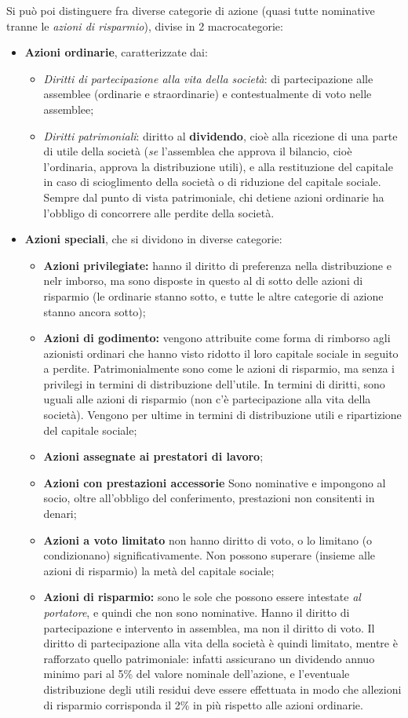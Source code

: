 \documentclass[a4paper,11pt]{article}
\begin{document}
Si può poi distinguere fra diverse categorie di azione (quasi tutte nominative tranne le \textit{azioni di risparmio}), divise in 2 macrocategorie:
\begin{itemize}
	\item \textbf{Azioni ordinarie}, caratterizzate dai:
	\begin{itemize}
		\item \textit{Diritti di partecipazione alla vita della società}: di partecipazione alle assemblee (ordinarie e straordinarie) e contestualmente di voto nelle assemblee;
		\item \textit{Diritti patrimoniali}: diritto al \textbf{dividendo}, cioè alla ricezione di una parte di utile della società (\textit{se} l'assemblea che approva il bilancio, cioè l'ordinaria, approva la distribuzione utili), e alla restituzione del capitale in caso di scioglimento della società o di riduzione del capitale sociale.
			Sempre dal punto di vista patrimoniale, chi detiene azioni ordinarie ha l'obbligo di concorrere alle perdite della società. 
	\end{itemize}
	\item \textbf{Azioni speciali}, che si dividono in diverse categorie:
		\begin{itemize}
			\item \textbf{Azioni privilegiate:} hanno il diritto di preferenza nella distribuzione e nelr imborso, ma sono disposte in questo al di sotto delle azioni di risparmio (le ordinarie stanno sotto, e tutte le altre categorie di azione stanno ancora sotto); 
			\item \textbf{Azioni di godimento:} vengono attribuite come forma di rimborso agli azionisti ordinari che hanno visto ridotto il loro capitale sociale in seguito a perdite. Patrimonialmente sono come le azioni di risparmio, ma senza i privilegi in termini di distribuzione dell'utile. In termini di diritti, sono uguali alle azioni di risparmio (non c'è partecipazione alla vita della società). Vengono per ultime in termini di distribuzione utili e ripartizione del capitale sociale;
			\item \textbf{Azioni assegnate ai prestatori di lavoro};
			\item \textbf{Azioni con prestazioni accessorie} Sono nominative e impongono al socio, oltre all'obbligo del conferimento, prestazioni non consitenti in denari;
			\item \textbf{Azioni a voto limitato} non hanno diritto di voto, o lo limitano (o condizionano) significativamente. Non possono superare (insieme alle azioni di risparmio) la metà del capitale sociale;
			\item \textbf{Azioni di risparmio:} sono le sole che possono essere intestate \textit{al portatore}, e quindi che non sono nominative.
				Hanno il diritto di partecipazione e intervento in assemblea, ma non il diritto di voto.
				Il diritto di partecipazione alla vita della società è quindi limitato, mentre è rafforzato quello patrimoniale: infatti assicurano un dividendo annuo minimo pari al 5\% del valore nominale dell'azione, e l'eventuale distribuzione degli utili residui deve essere effettuata in modo che allezioni di risparmio corrisponda il 2\% in più rispetto alle azioni ordinarie.


\end{itemize}
\end{itemize}
\end{document}
